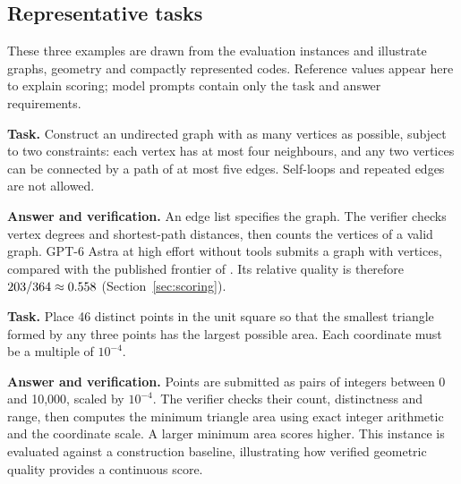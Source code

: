 \subsection{Representative tasks}
\label{sec:representative_tasks}
These three examples are drawn from the \DistinctN{} evaluation instances and illustrate graphs, geometry and compactly represented codes. Reference values appear here to explain scoring; model prompts contain only the task and answer requirements.

\begingroup
{}
\begin{taskbox}[mainexample,title={Degree--diameter graphs: degree 4, diameter 5}]
\textbf{Task.} Construct an undirected graph with as many vertices as possible, subject to two constraints: each vertex has at most four neighbours, and any two vertices can be connected by a path of at most five edges. Self-loops and repeated edges are not allowed.

\textbf{Answer and verification.} An edge list specifies the graph. The verifier checks vertex degrees and shortest-path distances, then counts the vertices of a valid graph. GPT-6 Astra at high effort without tools submits a graph with \TaskGraphVertices{} vertices, compared with the published frontier of \TaskGraphReference{}. Its relative quality is therefore $203/364\approx0.558$ (Section~\ref{sec:scoring}).
\end{taskbox}
\begin{taskbox}[mainexample,title={Heilbronn triangles: 46 points in a square}]
\textbf{Task.} Place 46 distinct points in the unit square so that the smallest triangle formed by any three points has the largest possible area. Each coordinate must be a multiple of $10^{-4}$.

\textbf{Answer and verification.} Points are submitted as pairs of integers between 0 and 10,000, scaled by $10^{-4}$. The verifier checks their count, distinctness and range, then computes the minimum triangle area using exact integer arithmetic and the coordinate scale. A larger minimum area scores higher. This instance is evaluated against a construction baseline, illustrating how verified geometric quality provides a continuous score.
\end{taskbox}
